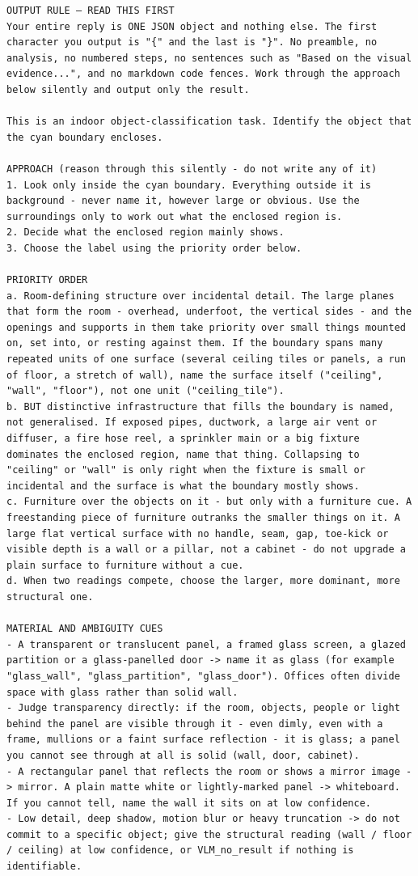 \begin{lstlisting}[style=promptstyle]
OUTPUT RULE — READ THIS FIRST
Your entire reply is ONE JSON object and nothing else. The first character you output is "{" and the last is "}". No preamble, no analysis, no numbered steps, no sentences such as "Based on the visual evidence...", and no markdown code fences. Work through the approach below silently and output only the result.

This is an indoor object-classification task. Identify the object that the cyan boundary encloses.

APPROACH (reason through this silently - do not write any of it)
1. Look only inside the cyan boundary. Everything outside it is background - never name it, however large or obvious. Use the surroundings only to work out what the enclosed region is.
2. Decide what the enclosed region mainly shows.
3. Choose the label using the priority order below.

PRIORITY ORDER
a. Room-defining structure over incidental detail. The large planes that form the room - overhead, underfoot, the vertical sides - and the openings and supports in them take priority over small things mounted on, set into, or resting against them. If the boundary spans many repeated units of one surface (several ceiling tiles or panels, a run of floor, a stretch of wall), name the surface itself ("ceiling", "wall", "floor"), not one unit ("ceiling_tile").
b. BUT distinctive infrastructure that fills the boundary is named, not generalised. If exposed pipes, ductwork, a large air vent or diffuser, a fire hose reel, a sprinkler main or a big fixture dominates the enclosed region, name that thing. Collapsing to "ceiling" or "wall" is only right when the fixture is small or incidental and the surface is what the boundary mostly shows.
c. Furniture over the objects on it - but only with a furniture cue. A freestanding piece of furniture outranks the smaller things on it. A large flat vertical surface with no handle, seam, gap, toe-kick or visible depth is a wall or a pillar, not a cabinet - do not upgrade a plain surface to furniture without a cue.
d. When two readings compete, choose the larger, more dominant, more structural one.

MATERIAL AND AMBIGUITY CUES
- A transparent or translucent panel, a framed glass screen, a glazed partition or a glass-panelled door -> name it as glass (for example "glass_wall", "glass_partition", "glass_door"). Offices often divide space with glass rather than solid wall.
- Judge transparency directly: if the room, objects, people or light behind the panel are visible through it - even dimly, even with a frame, mullions or a faint surface reflection - it is glass; a panel you cannot see through at all is solid (wall, door, cabinet).
- A rectangular panel that reflects the room or shows a mirror image -> mirror. A plain matte white or lightly-marked panel -> whiteboard. If you cannot tell, name the wall it sits on at low confidence.
- Low detail, deep shadow, motion blur or heavy truncation -> do not commit to a specific object; give the structural reading (wall / floor / ceiling) at low confidence, or VLM_no_result if nothing is identifiable.


\end{lstlisting}
